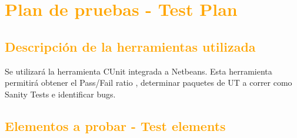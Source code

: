 





\newpage
\section{\textcolor{orange}{Plan de pruebas - Test Plan}}
\subsection{\textcolor{orange}{Descripción de la herramientas utilizada}}

Se utilizará la herramienta CUnit integrada a Netbeans. Esta herramienta permitirá obtener el Pass/Fail ratio , determinar paquetes de UT a correr como Sanity Tests e  identificar bugs.

\subsection{\textcolor{orange}{Elementos a probar - Test elements}}

